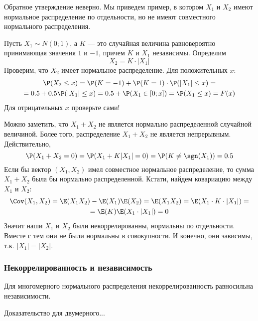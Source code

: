 Обратное утверждение неверно. Мы приведем пример, в котором $X_{1}$ и $X_{2}$ имеют нормальное распределение по отдельности, но не имеют совместного нормального распределения.

\begin{myex}
Пусть $X_{1}\sim N(0;1)$, а $K$ --- это случайная величина равновероятно принимающая значения $1$ и $-1$, причем $K$ и $X_{1}$ независимы. Определим
\begin{equation}
X_{2}=K\cdot |X_{1}|
\end{equation}
Проверим, что $X_{2}$ имеет нормальное распределение. Для положительных $x$:
\begin{multline}
\P(X_{2}\leq x)=\P(K=-1)+\P(K=1)\cdot \P(|X_{1}|\leq x)=\\
=0.5+0.5\P(|X_{1}|\leq x)=0.5+\P(X_{1}\in [0;x])=\P(X_{1}\leq x)=F(x)
\end{multline}
Для отрицательных $x$ проверьте сами!

Можно заметить, что $X_{1}+X_{2}$ не является нормально распределенной случайной величиной. Более того, распределение $X_{1}+X_{2}$ не является непрерывным. Действительно,
\begin{equation}
\P(X_{1}+X_{2}=0)=\P(X_{1}+K|X_{1}|=0)=\P(K\neq \sgn(X_{1}))=0.5
\end{equation}
Если бы вектор $(X_{1}, X_{2})$ имел совместное нормальное распределение, то сумма $X_{1}+X_{2}$ была бы нормально распределенной.
Кстати, найдем ковариацию между $X_{1}$ и $X_{2}$:
\begin{multline}
\Cov(X_{1},X_{2})=\E(X_{1}X_{2})-\E(X_{1})\E(X_{2})=\E(X_{1}X_{2})=\E(X_{1}\cdot K\cdot|X_{1}|)=\\
=\E(K)\E(X_{1}\cdot |X_{1}|)=0
\end{multline}
Значит наши $X_{1}$ и $X_{2}$ были некоррелированны, нормальны по отдельности. Вместе с тем они не были нормальны в совокупности. И конечно, они зависимы, т.к. $|X_{1}|=|X_{2}|$.

\end{myex}


\subsubsection*{Некоррелированность и независимость}

Для многомерного нормального распределения некоррелированность равносильна независимости.

Доказательство для двумерного...





